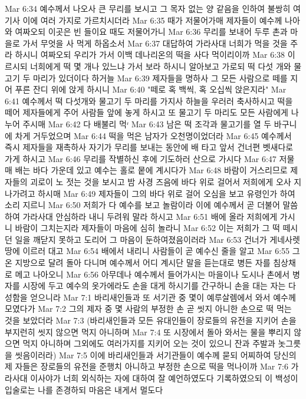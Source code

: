 Mar 6:34  예수께서 나오사 큰 무리를 보시고 그 목자 없는 양 같음을 인하여 불쌍히 여기사 이에 여러 가지로 가르치시더라
Mar 6:35  때가 저물어가매 제자들이 예수께 나아와 여짜오되 이곳은 빈 들이요 때도 저물어가니
Mar 6:36  무리를 보내어 두루 촌과 마을로 가서 무엇을 사 먹게 하옵소서
Mar 6:37  대답하여 가라사대 너희가 먹을 것을 주라 하시니 여짜오되 우리가 가서 이백 데나리온의 떡을 사다 먹이리이까
Mar 6:38  이르시되 너희에게 떡 몇 개나 있느냐 가서 보라 하시니 알아보고 가로되 떡 다섯 개와 물고기 두 마리가 있더이다 하거늘
Mar 6:39  제자들을 명하사 그 모든 사람으로 떼를 지어 푸른 잔디 위에 앉게 하시니
Mar 6:40  "떼로 혹 백씩, 혹 오십씩 앉은지라"
Mar 6:41  예수께서 떡 다섯개와 물고기 두 마리를 가지사 하늘을 우러러 축사하시고 떡을 떼어 제자들에게 주어 사람들 앞에 놓게 하시고 또 물고기 두 마리도 모든 사람에게 나누어 주시매
Mar 6:42  다 배불리 먹ʳ
Mar 6:43  남은 떡 조각과 물고기를 열 두 바구니에 차게 거두었으며
Mar 6:44  떡을 먹은 남자가 오천명이었더라
Mar 6:45  예수께서 즉시 제자들을 재촉하사 자기가 무리를 보내는 동안에 배 타고 앞서 건너편 벳새다로 가게 하시고
Mar 6:46  무리를 작별하신 후에 기도하러 산으로 가시다
Mar 6:47  저물매 배는 바다 가운데 있고 예수는 홀로 뭍에 계시다가
Mar 6:48  바람이 거스리므로 제자들의 괴로이 노 젓는 것을 보시고 밤 사경 즈음에 바다 위로 걸어서 저희에게 오사 지나가려고 하시매
Mar 6:49  제자들이 그의 바다 위로 걸어 오심을 보고 유령인가 하여 소리 지르니
Mar 6:50  저희가 다 예수를 보고 놀람이라 이에 예수께서 곧 더불어 말씀하여 가라사대 안심하라 내니 두려워 말라 하시고
Mar 6:51  배에 올라 저희에게 가시니 바람이 그치는지라 제자들이 마음에 심히 놀라니
Mar 6:52  이는 저희가 그 떡 떼시던 일을 깨닫지 못하고 도리어 그 마음이 둔하여졌음이러라
Mar 6:53  건너가 게네사렛 땅에 이르러 대고
Mar 6:54  배에서 내리니 사람들이 곧 예수신 줄을 알고
Mar 6:55  그 온 지방으로 달려 돌아 다니며 예수께서 어디 계시단 말을 듣는대로 병든 자를 침상채로 메고 나아오니
Mar 6:56  아무데나 예수께서 들어가시는 마을이나 도시나 촌에서 병자를 시장에 두고 예수의 옷가에라도 손을 대게 하시기를 간구하니 손을 대는 자는 다 성함을 얻으니라
Mar 7:1  바리새인들과 또 서기관 중 몇이 예루살렘에서 와서 예수께 모였다가
Mar 7:2  그의 제자 중 몇 사람의 부정한 손 곧 씻지 아니한 손으로 떡 먹는 것을 보았더라
Mar 7:3  (바리새인들과 모든 유대인들이 장로들의 유전을 지키어 손을 부지런히 씻지 않으면 먹지 아니하며
Mar 7:4  또 시장에서 돌아 와서는 물을 뿌리지 않으면 먹지 아니하며 그외에도 여러가지를 지키어 오는 것이 있으니 잔과 주발과 놋그릇을 씻음이러라)
Mar 7:5  이에 바리새인들과 서기관들이 예수께 묻되 어찌하여 당신의 제 자들은 장로들의 유전을 준행치 아니하고 부정한 손으로 떡을 먹나이까
Mar 7:6  가라사대 이사야가 너희 외식하는 자에 대하여 잘 예언하였도다 기록하였으되 이 백성이 입술로는 나를 존경하되 마음은 내게서 멀도다
